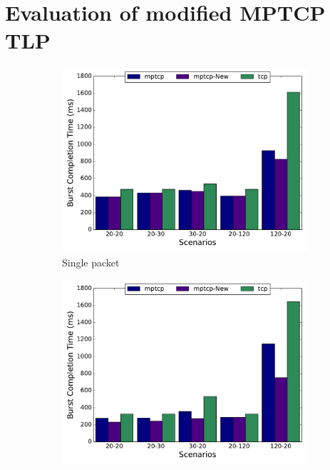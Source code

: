 \documentclass[10pt,conference]{IEEEtran}
\begin{document}
\section{Evaluation of modified MPTCP TLP}\label{eval}

\begin{figure}[!tbp]
\begin{subfigure}[b]{0.32\textwidth}
\includegraphics[angle=0, width=\textwidth, natwidth=578.16,natheight=433.62]{plots/1PNew.pdf}
\caption{Single packet}\label{1pn}
\end{subfigure}
\hfill
\begin{subfigure}[b]{0.32\textwidth}
\includegraphics[angle=0, width=\textwidth, natwidth=578.16,natheight=433.62]{plots/2PNew.pdf}

\end{subfigure}
\end{figure}
\end{document}
